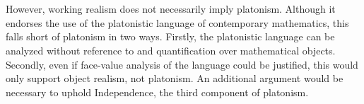 \documentclass[10pt,a4paper]{article}
\begin{document}
                        \\
                        \\
                        However, working realism does not necessarily imply platonism. Although it endorses the use of the platonistic language of contemporary mathematics, this falls short of platonism in two ways. Firstly, the platonistic language can be analyzed without reference to and quantification over mathematical objects. Secondly, even if face-value analysis of the language could be justified, this would only support object realism, not platonism. An additional argument would be necessary to uphold Independence, the third component of platonism.\cite{sep-platonism-mathematics}\cite{Benson2006-jm}\cite{Tegmark2008-qv}
                        

                            


                        





                        

                


                    \newpage
                    
                    
            
\end{document}
